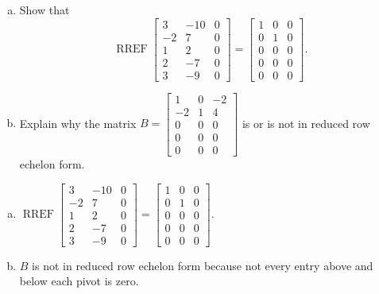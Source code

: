 
\begin{exerciseStatement}

\begin{enumerate}[(a)]
\item Show that \[\operatorname{RREF} \left[\begin{array}{ccc}
3 & -10 & 0 \\
-2 & 7 & 0 \\
1 & 2 & 0 \\
2 & -7 & 0 \\
3 & -9 & 0
\end{array}\right] = \left[\begin{array}{ccc}
1 & 0 & 0 \\
0 & 1 & 0 \\
0 & 0 & 0 \\
0 & 0 & 0 \\
0 & 0 & 0
\end{array}\right] .\]
\item Explain why the matrix \(B= \left[\begin{array}{ccc}
1 & 0 & -2 \\
-2 & 1 & 4 \\
0 & 0 & 0 \\
0 & 0 & 0 \\
0 & 0 & 0
\end{array}\right] \) is or is not in reduced row echelon form.
\end{enumerate}
    
\end{exerciseStatement}
    
\begin{exerciseAnswer} 

\begin{enumerate}[(a)]
\item \(\operatorname{RREF} \left[\begin{array}{ccc}
3 & -10 & 0 \\
-2 & 7 & 0 \\
1 & 2 & 0 \\
2 & -7 & 0 \\
3 & -9 & 0
\end{array}\right] = \left[\begin{array}{ccc}
1 & 0 & 0 \\
0 & 1 & 0 \\
0 & 0 & 0 \\
0 & 0 & 0 \\
0 & 0 & 0
\end{array}\right] .\)
\item \(B\) is not in reduced row echelon form because not every entry above and below each pivot is zero. 
\end{enumerate}
    
\end{exerciseAnswer}
    
